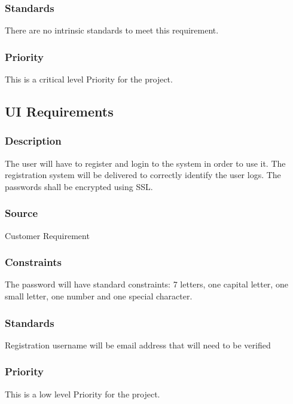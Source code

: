 \subsubsection{Standards}
There are no intrinsic standards to meet this requirement.
\subsubsection{Priority}
This is a critical level Priority for the project.

\subsection{UI Requirements}
\subsubsection{Description}
The user will have to register and login to the system in order to use it. The registration system will be delivered to correctly identify the user logs. The passwords shall be encrypted using SSL.
\subsubsection{Source}
Customer Requirement
\subsubsection{Constraints}
The password will have standard constraints: 7 letters, one capital letter, one small letter, one number and one special character.
\subsubsection{Standards}
Registration username will be email address that will need to be verified
\subsubsection{Priority}
This is a low level Priority for the project.
